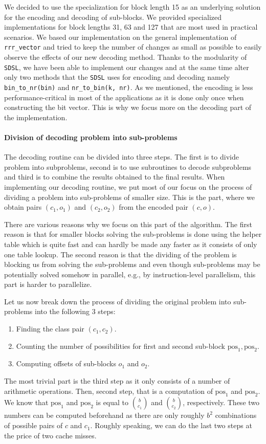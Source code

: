 We decided to use the specialization for block length 15 as an underlying solution for the encoding and
decoding of sub-blocks. We provided specialized implementations for block lengths 31, 63 and 127 that
are most used in practical scenarios. We based our implementation on the general implementation of
\verb'rrr_vector' and tried to keep the number of changes as small as possible to easily observe the
effects of our new decoding method. Thanks to the modularity of \texttt{SDSL}, we have been able to
implement our changes and at the same time alter only two methods that the \texttt{SDSL} uses for
encoding and decoding namely \verb'bin_to_nr(bin)' and \verb'nr_to_bin(k, nr)'. As we mentioned,
the encoding is less performance-critical in most of the applications as it is done only once when
constructing the bit vector. This is why we focus more on the decoding part of the implementation.

\paragraph{Division of decoding problem into sub-problems}

The decoding routine can be divided into three steps. The first is to divide problem into subproblems,
second is to use subroutines to decode subproblems and third is to combine the results obtained to the final
results. When implementing our decoding routine, we put most of our focus on the process of dividing
a problem into sub-problems of smaller size. This is the part, where we obtain pairs $(c_1, o_1)$ and $(c_2, o_2)$
from the encoded pair $(c, o)$.

There are various reasons why we focus on this part of the algorithm. The first reason is that for smaller
blocks solving the sub-problems is done using the helper table which is quite fast and can hardly be made
any faster as it consists of only one table lookup. The second reason is that the dividing of the problem
is blocking us from solving the sub-problems and even though sub-problems may be potentially solved somehow
in parallel, e.g., by instruction-level parallelism, this part is harder to parallelize.

Let us now break down the process of dividing the original problem into sub-problems into the following 3 steps:
\begin{enumerate}
	\item Finding the class pair $(c_1, c_2)$.
	\item Counting the number of possibilities for first and second sub-block $\text{pos}_1, \text{pos}_2$.
	\item Computing offsets of sub-blocks $o_1$ and $o_2$.
\end{enumerate}
The most trivial part is the third step as it only consists of a number of arithmetic operations. Then,
second step, that is a computation of $\text{pos}_1$ and $\text{pos}_2$. We know that $\text{pos}_1$
and $\text{pos}_2$ is equal to ${b\choose c_1}$ and ${b\choose c_2}$, respectively. These two numbers
can be computed beforehand as there are only roughly $b^2$ combinations of possible pairs of $c$ and $c_1$.
Roughly speaking, we can do the last two steps at the price of two cache misses.

